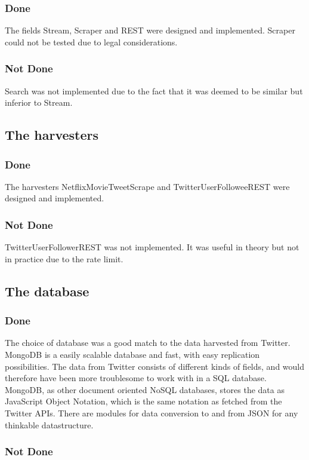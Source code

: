 \subsubsection{Done}
The fields Stream, Scraper and REST were designed and implemented. Scraper could not be tested due to legal considerations.
\subsubsection{Not Done}
Search was not implemented due to the fact that it was deemed to be similar but inferior to Stream.

\subsection{The harvesters}
\subsubsection{Done}
The harvesters NetflixMovieTweetScrape
and TwitterUserFolloweeREST were designed and implemented.
\subsubsection{Not Done}
TwitterUserFollowerREST was not implemented. It was useful in theory but not in practice due to the rate limit.

\subsection{The database}
\subsubsection{Done}
The choice of database was a good match to the data harvested from Twitter. MongoDB is a easily scalable database and fast, with easy replication possibilities. The data from Twitter consists of different kinds of fields, and would therefore have been more troublesome to work with in a SQL database. MongoDB, as other document oriented NoSQL databases, stores the data as JavaScript Object Notation, which is the same notation as fetched from the Twitter APIs. There are modules for data conversion to and from JSON for any thinkable datastructure.

\subsubsection{Not Done}


